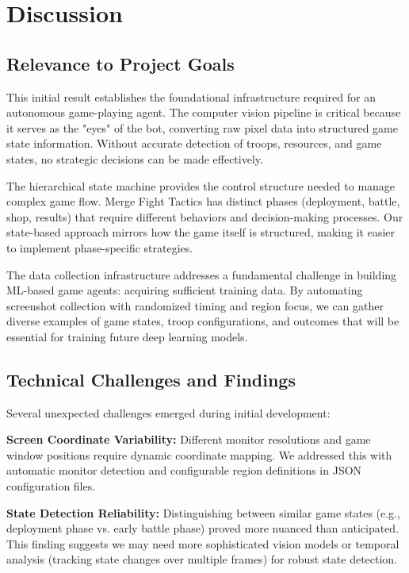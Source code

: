 \documentclass[12pt]{article}
\begin{document}
\section*{Discussion}

\subsection*{Relevance to Project Goals}
This initial result establishes the foundational infrastructure required for an autonomous game-playing agent. The computer vision pipeline is critical because it serves as the "eyes" of the bot, converting raw pixel data into structured game state information. Without accurate detection of troops, resources, and game states, no strategic decisions can be made effectively.

The hierarchical state machine provides the control structure needed to manage complex game flow. Merge Fight Tactics has distinct phases (deployment, battle, shop, results) that require different behaviors and decision-making processes. Our state-based approach mirrors how the game itself is structured, making it easier to implement phase-specific strategies.

The data collection infrastructure addresses a fundamental challenge in building ML-based game agents: acquiring sufficient training data. By automating screenshot collection with randomized timing and region focus, we can gather diverse examples of game states, troop configurations, and outcomes that will be essential for training future deep learning models.

\subsection*{Technical Challenges and Findings}
Several unexpected challenges emerged during initial development:

\textbf{Screen Coordinate Variability:} Different monitor resolutions and game window positions require dynamic coordinate mapping. We addressed this with automatic monitor detection and configurable region definitions in JSON configuration files.

\textbf{State Detection Reliability:} Distinguishing between similar game states (e.g., deployment phase vs. early battle phase) proved more nuanced than anticipated. This finding suggests we may need more sophisticated vision models or temporal analysis (tracking state changes over multiple frames) for robust state detection.
\end{document}
